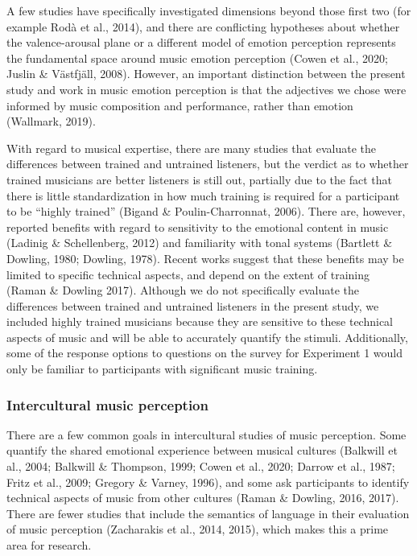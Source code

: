 \documentclass[
  english,
  man,floatsintext]{apa6}
\begin{document}
A few studies have specifically investigated dimensions beyond those first two (for example Rodà et al., 2014), and there are conflicting hypotheses about whether the valence-arousal plane or a different model of emotion perception represents the fundamental space around music emotion perception (Cowen et al., 2020; Juslin \& Västfjäll, 2008). However, an important distinction between the present study and work in music emotion perception is that the adjectives we chose were informed by music composition and performance, rather than emotion (Wallmark, 2019).

With regard to musical expertise, there are many studies that evaluate the differences between trained and untrained listeners, but the verdict as to whether trained musicians are better listeners is still out, partially due to the fact that there is little standardization in how much training is required for a participant to be ``highly trained'' (Bigand \& Poulin-Charronnat, 2006). There are, however, reported benefits with regard to sensitivity to the emotional content in music (Ladinig \& Schellenberg, 2012) and familiarity with tonal systems (Bartlett \& Dowling, 1980; Dowling, 1978). Recent works suggest that these benefits may be limited to specific technical aspects, and depend on the extent of training (Raman \& Dowling 2017). Although we do not specifically evaluate the differences between trained and untrained listeners in the present study, we included highly trained musicians because they are sensitive to these technical aspects of music and will be able to accurately quantify the stimuli. Additionally, some of the response options to questions on the survey for Experiment 1 would only be familiar to participants with significant music training.

\hypertarget{intercultural-music-perception}{%
\subsubsection{Intercultural music perception}\label{intercultural-music-perception}}

There are a few common goals in intercultural studies of music perception. Some quantify the shared emotional experience between musical cultures (Balkwill et al., 2004; Balkwill \& Thompson, 1999; Cowen et al., 2020; Darrow et al., 1987; Fritz et al., 2009; Gregory \& Varney, 1996), and some ask participants to identify technical aspects of music from other cultures (Raman \& Dowling, 2016, 2017). There are fewer studies that include the semantics of language in their evaluation of music perception (Zacharakis et al., 2014, 2015), which makes this a prime area for research.
\end{document}

